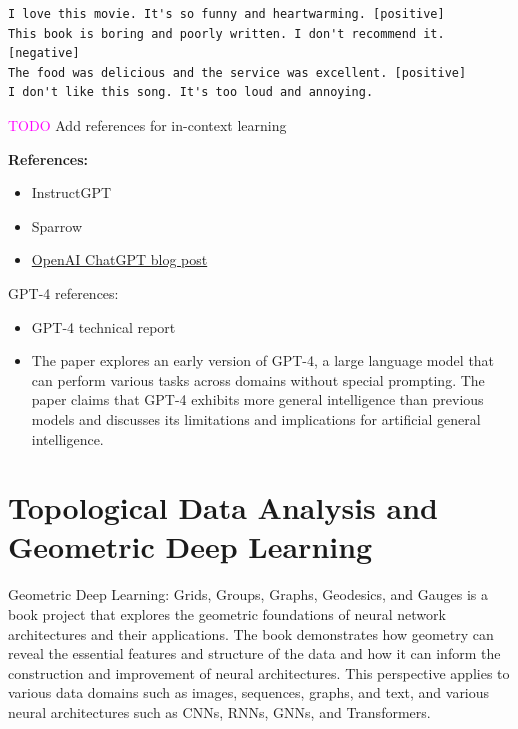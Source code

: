 \documentclass[11pt, a4paper]{amsart}
\begin{document}
\begin{lstlisting}
I love this movie. It's so funny and heartwarming. [positive]
This book is boring and poorly written. I don't recommend it. [negative]
The food was delicious and the service was excellent. [positive]
I don't like this song. It's too loud and annoying.
\end{lstlisting}


\textcolor{magenta}{TODO} Add references for in-context learning



\noindent \textbf{References:}
\begin{itemize}
	\item InstructGPT  \cite{ouyang2022training}
	\item Sparrow \cite{glaese2022improving}
	\item \href{https://openai.com/blog/chatgpt}{OpenAI ChatGPT blog post}
\end{itemize}

GPT-4 references:
\begin{itemize}
	\item GPT-4 technical report \cite{openai2023gpt4}
	\item The paper \cite{bubeck2023sparks} explores an early version of GPT-4, a large language model that can perform various tasks across domains without special prompting. The paper claims that GPT-4 exhibits more general intelligence than previous models and discusses its limitations and implications for artificial general intelligence.
\end{itemize}


\section{Topological Data Analysis and Geometric Deep Learning}

Geometric Deep Learning: Grids, Groups, Graphs, Geodesics, and Gauges is a book project \cite{bronstein2021geometric} that explores the geometric foundations of neural network architectures and their applications.
The book demonstrates how geometry can reveal the essential features and structure of the data and how it can inform the construction and improvement of neural architectures.
This perspective applies to various data domains such as images, sequences, graphs, and text, and various neural architectures such as CNNs, RNNs, GNNs, and Transformers.
\end{document}
